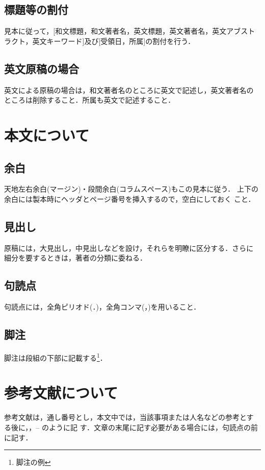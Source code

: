 \documentclass[a4j, 12Q, twocolumn, twoside]{jsarticle}
\begin{document}
\subsection{標題等の割付}
見本に従って，[和文標題，和文著者名，英文標題，英文著者名，英文アブスト
ラクト，英文キーワード]及び[受領日，所属]の割付を行う．

\subsection{英文原稿の場合}
英文による原稿の場合は，和文著者名のところに英文で記述し，英文著者名の
ところは削除すること．所属も英文で記述すること．

\section{本文について}

\subsection{余白}
天地左右余白(マージン)・段間余白(コラムスペース)もこの見本に従う．
上下の余白には製本時にヘッダとページ番号を挿入するので，空白にしておく
こと．

\subsection{見出し}
原稿には，大見出し，中見出しなどを設け，それらを明瞭に区分する．さらに
細分を要するときは，著者の分類に委ねる．

\subsection{句読点}
句読点には，全角ピリオド(．)，全角コンマ(，)を用いること．

\subsection{脚注}
脚注は段組の下部に記載する\footnote{脚注の例}．

\section{参考文献について}
参考文献は，通し番号とし，本文中では，当該事項または人名などの参考とす
る後に，\cite{TRA96HuHaCo}，\cite{SICE02Yo}--\cite{Asa02Ar} のように記
す．文章の末尾に記す必要がある場合には，句読点の前に記す．
\end{document}
